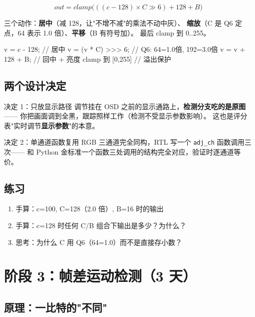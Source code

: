 \documentclass[11pt]{ctexart}
\newcommand{\code}[1]{\texttt{#1}}
\begin{document}
$$out = clamp\big(((c - 128) \times C \gg 6) + 128 + B\big)$$

三个动作：\textbf{居中}（减 128，让"不增不减"的乘法不动中灰）、
\textbf{缩放}（C 是 Q6 定点，64 表示 1.0 倍）、\textbf{平移}（B 有符号加）。
最后 clamp 到 0..255。

\begin{Verilog}
v = c - 128;                    // 居中
v = (v * C) >>> 6;              // Q6: 64=1.0倍, 192=3.0倍
v = v + 128 + B;                // 回中 + 亮度
clamp 到 [0,255]                // 溢出保护
\end{Verilog}

\subsection{两个设计决定}

\begin{keybox}{决定 1：只放显示路径}
调节挂在 OSD 之前的显示通路上，\textbf{检测分支吃的是原图}——
你把画面调到全黑，跟踪照样工作（检测不受显示参数影响）。
这也是评分表"实时调节\textbf{显示参数}"的本意。
\end{keybox}

\begin{keybox}{决定 2：单通道函数复用}
RGB 三通道完全同构，RTL 写一个 \code{adj\_ch} 函数调用三次——
和 Python 金标准一个函数三处调用的结构完全对应，验证时逐通道等价。
\end{keybox}

\subsection{练习}

\begin{enumerate}
  \item 手算：c=100, C=128（2.0 倍）, B=16 时的输出
  \item 手算：c=128 时任何 C/B 组合下输出是多少？为什么？
  \item 思考：为什么 C 用 Q6（64=1.0）而不是直接存小数？
\end{enumerate}

\section{阶段 3：帧差运动检测（3 天）}

\subsection{原理：一比特的"不同"}
\end{document}
